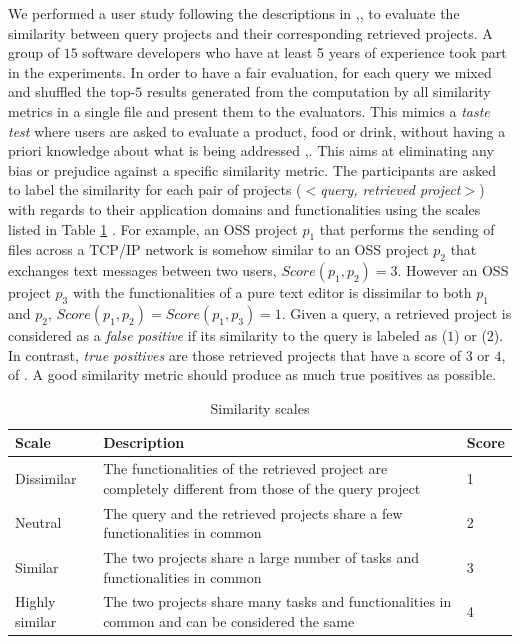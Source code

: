 We performed a user study following the descriptions in \cite{Lo:2012:DSA:2473496.2473616},\cite{McMillan:2012:DSS:2337223.2337267},\cite{10.1109/SANER.2017.7884605} to evaluate the similarity between query projects and their corresponding retrieved projects. A group of $15$ software developers who have at least 5 years of experience took part in the experiments. In order to have a fair evaluation, for each query we mixed and shuffled the top-$5$ results generated from the computation by all similarity metrics in a single file and present them to the evaluators. This mimics a \emph{taste test} where users are asked to evaluate a product, \eg food or drink, without having a priori knowledge about what is being addressed \cite{Ghose2001},\cite{doi:10.1108/13522750810879048}. This aims at eliminating any bias or prejudice against a specific similarity metric. The participants are asked to label the similarity for each pair of projects (\ie $<$\textit{query, retrieved project}$>$) with regards to their application domains and functionalities using the scales listed in Table \ref{tab:Scales} \cite{McMillan:2012:DSS:2337223.2337267}. For example, an OSS project $p_{1}$ that performs the sending of files across a TCP/IP network is somehow similar to an OSS project $p_{2}$ that exchanges text messages between two users, \ie $Score(p_{1},p_{2})=3$. However an OSS project $p_{3}$ with the functionalities of a pure text editor is dissimilar to both $p_{1}$ and $p_{2}$, \ie $Score(p_{1},p_{2})=Score(p_{1},p_{3})=1$. Given a query, a retrieved project is considered as a \emph{false positive} if its similarity to the query is labeled as  ($1$) or  ($2$). In contrast, \emph{true positives} are those retrieved projects that have a score of $3$ or $4$, \ie {} of . A good similarity metric should produce as much true positives as possible.

\begin{table}[h!]
	\centering
	\begin{tabular}{|p{3.0cm}|p{8.0cm}|p{1.0cm}|}  \hline
		{\bf Scale} & {\bf Description} & {\bf Score} \\  \hline
		Dissimilar & The functionalities of the retrieved project are completely different from those of the query project & 1 \\ \hline
		Neutral & The query and the retrieved projects share a few functionalities in common & 2 \\ \hline
		Similar & The two projects share a large number of tasks and functionalities in common & 3 \\ \hline
		Highly similar & The two projects share many tasks and functionalities in common and can be considered the same & 4 \\ \hline
	\end{tabular}
	\caption[The similarity scales]{Similarity scales}
	\label{tab:Scales}
\end{table}


